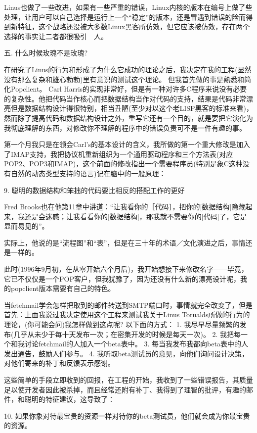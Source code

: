 \documentclass[a4paper,12pt,UTF8,twoside]{ctexbook}
\begin{document}
Linus也做了一些改进，如果有一些严重的错误，Linux内核的版本在编号上做了些处理，让用户可以自己选择是运行上一个“稳定”的版本，还是冒遇到错误的险而得到新特征，这个战略还没被大多数Linux黑客所仿效，但它应该被仿效，存在两个选择的事实让二者都很吸引　人。


五. 什么时候玫瑰不是玫瑰?


在研究了Linus的行为和形成了为什么它成功的理论之后，我决定在我的工程(显然没有那么复杂和雄心勃勃)里有意识的测试这个理论。
但我首先做的事是熟悉和简化Popclient。 Carl Harris的实现非常好，但是有一种对许多C程序来说没有必要的复杂性。他把代码当作核心而把数据结构当作对代码的支持，结果是代码非常漂亮但是数据结构设计得很特别，相当丑陋(至少对以这个老LISP黑客的标准来看)，然而除了提高代码和数据结构设计之外，重写它还有一个目的，就是要把它演化为我彻底理解的东西，对修改你不理解的程序中的错误负责可不是一件有趣的事。


第一个月我只是在领会Carl's的基本设计的含义，我所做的第一个重大修改是加入了IMAP支持，我把协议机重新组织为一个通用驱动程序和三个方法表(对应POP2、POP3和IMAP)，这个前面的修改指出一个需要程序员(特别是象C这种没有自然的动态类型支持的语言)记在脑中的一般原理：


9. 聪明的数据结构和笨拙的代码要比相反的搭配工作的更好


Fred Brooks也在他第11章中讲道：“让我看你的［代码］，把你的[数据结构]隐藏起来，我还是会迷惑；让我看看你的[数据结构]，那我就不需要你的[代码]了，它是显而易见的”。


实际上，他说的是“流程图”和“表”，但是在三十年的术语／文化演进之后，事情还是一样的。


此时(1996年9月初，在从零开始六个月后)，我开始想接下来修改名字——毕竟，它已不仅仅是一个POP客户，但我犹豫了，因为还没有什么新的漂亮设计呢，我的popclient版本需要有自己的特色。


当fetehmail学会怎样把取到的邮件转送到SMTP端口时，事情就完全改变了，但是首先：上面我说过我决定使用这个工程来测试我关于Linus Torualds所做的行为的理论，(你可能会问)我怎样做到这点呢? 以下面的方式：
1. 我尽早尽量频繁的发布(几乎从未少于每十天发布一次；在密集开发的时候是每天一次)。
2. 我把每一个和我讨论fetchmail的人加入一个beta表中。
3. 每当我发布我都向beta表中的人发出通告，鼓励人们参与。
4. 我听取beta测试员的意见，向他们询问设计决策，对他们寄来的补丁和反馈表示感谢。


这些简单的手段立即收到的回报，在工程的开始，我收到了一些错误报告，其质量足以使开发者因此被杀掉，而且经常还附有补丁、我得到了理智的批评，有趣的邮件，和聪明的特征建议，这导致了：


10. 如果你象对待最宝贵的资源一样对待你的beta测试员，他们就会成为你最宝贵的资源。
\end{document}
